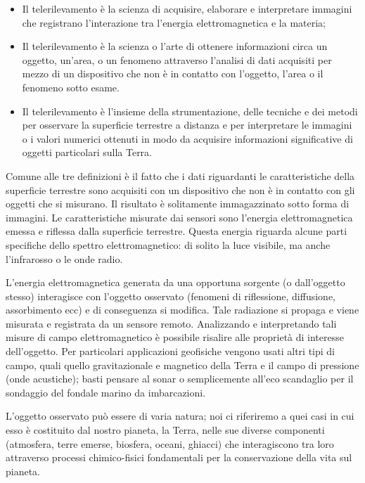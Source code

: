 \documentclass[
]{book}
\theoremstyle{definition}
\theoremstyle{definition}
\theoremstyle{definition}
\theoremstyle{definition}
\theoremstyle{remark}
\begin{document}
\begin{itemize}
\item
  Il telerilevamento è la scienza di acquisire, elaborare e interpretare immagini che registrano l'interazione tra l'energia elettromagnetica e la materia;
\item
  Il telerilevamento è la scienza o l'arte di ottenere informazioni circa un oggetto, un'area, o un fenomeno attraverso l'analisi di dati acquisiti per mezzo di un dispositivo che non è in contatto con l'oggetto, l'area o il fenomeno sotto esame.
\item
  Il telerilevamento è l'insieme della strumentazione, delle tecniche e dei metodi per osservare la superficie terrestre a distanza e per interpretare le immagini o i valori numerici ottenuti in modo da acquisire informazioni significative di oggetti particolari sulla Terra.
\end{itemize}

Comune alle tre definizioni è il fatto che i dati riguardanti le caratteristiche della superficie terrestre sono acquisiti con un dispositivo che non è in contatto con gli oggetti che si misurano. Il risultato è solitamente immagazzinato sotto forma di immagini. Le caratteristiche misurate dai sensori sono l'energia elettromagnetica emessa e riflessa dalla superficie terrestre. Questa energia riguarda alcune parti specifiche dello spettro elettromagnetico: di solito la luce visibile, ma anche l'infrarosso o le onde radio.

L'energia elettromagnetica generata da una opportuna sorgente (o dall'oggetto stesso) interagisce con l'oggetto osservato (fenomeni di riflessione, diffusione, assorbimento ecc) e di conseguenza si modifica. Tale radiazione si propaga e viene misurata e registrata da un sensore remoto. Analizzando e interpretando tali misure di campo elettromagnetico è possibile risalire alle proprietà di interesse dell'oggetto. Per particolari applicazioni geofisiche vengono usati altri tipi di campo, quali quello gravitazionale e magnetico della Terra e il campo di pressione (onde acustiche); basti pensare al sonar o semplicemente all'eco scandaglio per il sondaggio del fondale marino da imbarcazioni.

L'oggetto osservato può essere di varia natura; noi ci riferiremo a quei casi in cui esso è costituito dal nostro pianeta, la Terra, nelle sue diverse componenti (atmosfera, terre emerse, biosfera, oceani, ghiacci) che interagiscono tra loro attraverso processi chimico-fisici fondamentali per la conservazione della vita sul pianeta.
\end{document}
